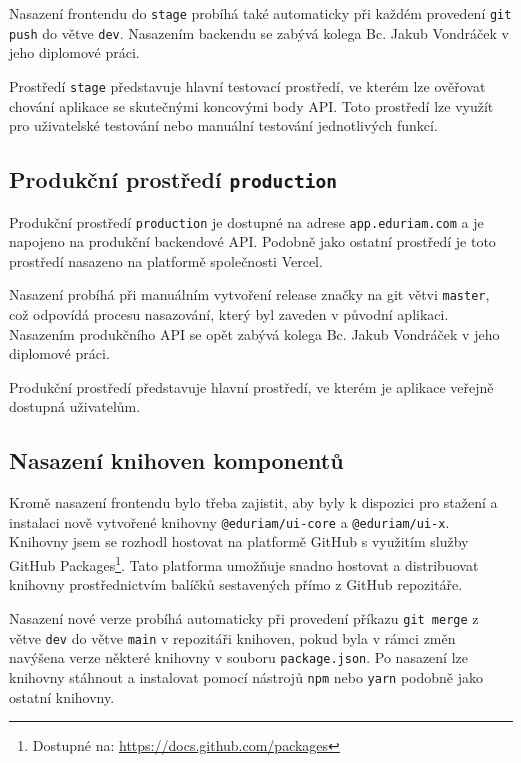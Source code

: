 Nasazení frontendu do \texttt{stage} probíhá také automaticky při každém provedení \texttt{git push} do větve \texttt{dev}. Nasazením backendu se zabývá kolega Bc. Jakub Vondráček v jeho diplomové práci.

Prostředí \texttt{stage} představuje hlavní testovací prostředí, ve kterém lze ověřovat chování aplikace se skutečnými koncovými body API. Toto prostředí lze využít pro uživatelské testování nebo manuální testování jednotlivých funkcí.

\subsection{Produkční prostředí \texttt{production}}

Produkční prostředí \texttt{production} je dostupné na adrese \texttt{app.eduriam.com} a je napojeno na produkční backendové API. Podobně jako ostatní prostředí je toto prostředí nasazeno na platformě společnosti Vercel.

Nasazení probíhá při manuálním vytvoření release značky na git větvi \texttt{master}, což odpovídá procesu nasazování, který byl zaveden v původní aplikaci. Nasazením produkčního API se opět zabývá kolega Bc. Jakub Vondráček v jeho diplomové práci.

Produkční prostředí představuje hlavní prostředí, ve kterém je aplikace veřejně dostupná uživatelům.

\subsection{Nasazení knihoven komponentů}

Kromě nasazení frontendu bylo třeba zajistit, aby byly k dispozici pro stažení a instalaci nově vytvořené knihovny \texttt{@eduriam/ui-core} a \texttt{@eduriam/ui-x}. Knihovny jsem se rozhodl hostovat na platformě GitHub s využitím služby GitHub Packages\footnote{Dostupné na: \href{https://docs.github.com/packages}{https://docs.github.com/packages}}. Tato platforma umožňuje snadno hostovat a distribuovat knihovny prostřednictvím balíčků sestavených přímo z GitHub repozitáře.

Nasazení nové verze probíhá automaticky při provedení příkazu \texttt{git merge} z větve \texttt{dev} do větve \texttt{main} v repozitáři knihoven, pokud byla v rámci změn navýšena verze některé knihovny v souboru \texttt{package.json}. Po nasazení lze knihovny stáhnout a instalovat pomocí nástrojů \texttt{npm} nebo \texttt{yarn} podobně jako ostatní knihovny.
